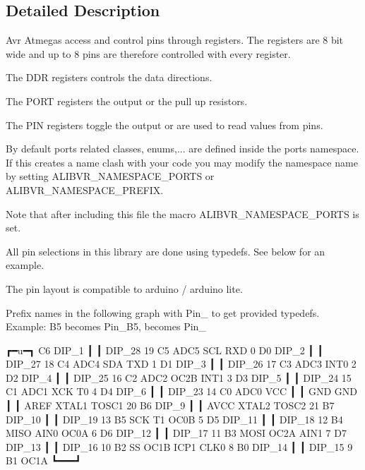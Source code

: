 \subsection{Detailed Description}
Avr Atmegas access and control pins through registers. The registers are 8 bit wide and up to 8 pins are therefore controlled with every register. 


\begin{DoxyItemize}
\item The D\+DR registers controls the data directions.
\item The P\+O\+RT registers the output or the pull up resistors.
\item The P\+IN registers toggle the output or are used to read values from pins.
\end{DoxyItemize}

By default ports related classes, enums,... are defined inside the {\ttfamily ports} namespace. If this creates a name clash with your code you may modify the namespace name by setting A\+L\+I\+B\+V\+R\+\_\+\+N\+A\+M\+E\+S\+P\+A\+C\+E\+\_\+\+P\+O\+R\+TS or A\+L\+I\+B\+V\+R\+\_\+\+N\+A\+M\+E\+S\+P\+A\+C\+E\+\_\+\+P\+R\+E\+F\+IX.

Note that after including this file the macro A\+L\+I\+B\+V\+R\+\_\+\+N\+A\+M\+E\+S\+P\+A\+C\+E\+\_\+\+P\+O\+R\+TS is set.

All pin selections in this library are done using {\ttfamily typedef}s. See below for an example.

The pin layout is compatible to arduino / arduino lite.

Prefix names in the following graph with {\ttfamily Pin\+\_\+} to get provided {\ttfamily typedef}s. Example\+: {\ttfamily B5} becomes {\ttfamily Pin\+\_\+\+B5}, {} becomes {\ttfamily Pin\+\_}


\begin{DoxyCode}
                                 ┏━u━┓
                     C6    DIP\_1 ┃   ┃ DIP\_28   19   C5   ADC5   SCL
RXD              0   D0    DIP\_2 ┃   ┃ DIP\_27   18   C4   ADC4   SDA
TXD              1   D1    DIP\_3 ┃   ┃ DIP\_26   17   C3   ADC3
        INT0     2   D2    DIP\_4 ┃   ┃ DIP\_25   16   C2   ADC2
OC2B    INT1     3   D3    DIP\_5 ┃   ┃ DIP\_24   15   C1   ADC1
XCK     T0       4   D4    DIP\_6 ┃   ┃ DIP\_23   14   C0   ADC0
                             VCC ┃   ┃ GND
                             GND ┃   ┃ AREF
XTAL1   TOSC1   20   B6    DIP\_9 ┃   ┃ AVCC
XTAL2   TOSC2   21   B7   DIP\_10 ┃   ┃ DIP\_19   13   B5   SCK
T1      OC0B     5   D5   DIP\_11 ┃   ┃ DIP\_18   12   B4   MISO
AIN0    OC0A     6   D6   DIP\_12 ┃   ┃ DIP\_17   11   B3   MOSI   OC2A
AIN1             7   D7   DIP\_13 ┃   ┃ DIP\_16   10   B2   SS     OC1B
ICP1    CLK0     8   B0   DIP\_14 ┃   ┃ DIP\_15    9   B1          OC1A
                                 ┗━━━┛
\end{DoxyCode}
 

